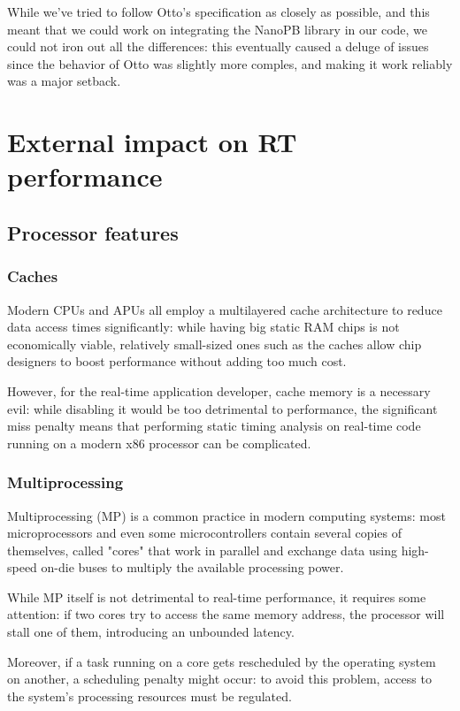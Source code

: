 \documentclass[a4paper,12pt]{report}
\begin{document}
While we've tried to follow Otto's specification as closely as possible, and this meant that we could work on integrating the NanoPB library in our code, we could not iron out all the differences: this eventually caused a deluge of issues since the behavior of Otto was slightly more comples, and making it work reliably was a major setback.

\section{External impact on RT performance}

\subsection{Processor features}

\subsubsection{Caches}

Modern CPUs and APUs all employ a multilayered cache architecture to reduce data access times significantly: while having big static RAM chips is not economically viable, relatively small-sized ones such as the caches allow chip designers to boost performance without adding too much cost. 

However, for the real-time application developer, cache memory is a necessary evil: while disabling it would be too detrimental to performance, the significant miss penalty means that performing static timing analysis on real-time code running on a modern x86 processor can be complicated.

\subsubsection{Multiprocessing}

Multiprocessing (MP) is a common practice in modern computing systems: most microprocessors and even some microcontrollers contain several copies of themselves, called "cores" that work in parallel and exchange data using high-speed on-die buses to multiply the available processing power.

While MP itself is not detrimental to real-time performance, it requires some attention: if two cores try to access the same memory address, the processor will stall one of them, introducing an unbounded latency.   

Moreover, if a task running on a core gets rescheduled by the operating system on another, a scheduling penalty might occur: to avoid this problem, access to the system's processing resources must be regulated. 
\end{document}
